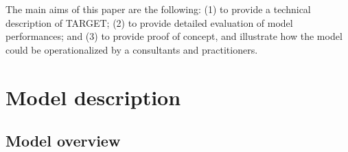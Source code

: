 \documentclass[final,3p,times,authoryear]{elsarticle}
\begin{document}

The main aims of this paper are the following: (1) to provide a technical description of TARGET; (2) to provide detailed evaluation of model performances; and (3) to provide proof of concept, and illustrate how the model could be operationalized  by a consultants and practitioners.



\section{Model description}\label{sec:ModelOverview}
\subsection{Model overview}
\end{document}
